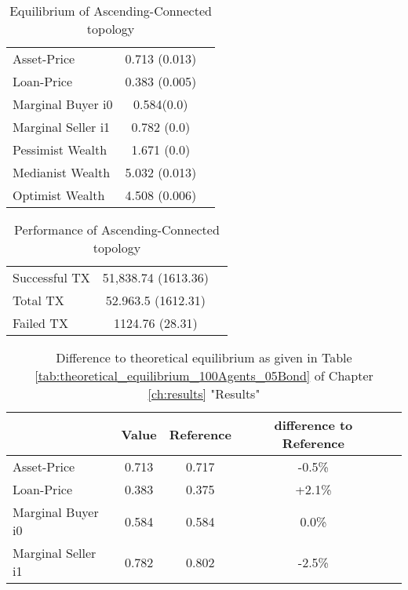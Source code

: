 \documentclass[Bachelorarbeit.tex]{subfiles}
\begin{document}
\begin{table}[h]
	\caption{Equilibrium of Ascending-Connected topology}
	\centering
	\begin{tabular} { l c r }
		\hline
		Asset-Price & 0.713 (0.013) \\
		Loan-Price & 0.383 (0.005) \\
		Marginal Buyer i0 & 0.584(0.0) \\
		Marginal Seller i1 & 0.782 (0.0) \\
		\hline
		Pessimist Wealth & 1.671 (0.0) \\
		Medianist Wealth & 5.032 (0.013) \\
		Optimist Wealth & 4.508 (0.006) \\
		\hline
	\end{tabular}
\end{table} 

\begin{table}[h]
	\caption{Performance of Ascending-Connected topology}
	\centering
	\begin{tabular} { l c r }
		\hline
		Successful TX & 51,838.74 (1613.36) \\
		Total TX & 52.963.5 (1612.31) \\
		Failed TX & 1124.76 (28.31) \\
		\hline
	\end{tabular}
\end{table}


\begin{table}[h]
	\caption{Difference to theoretical equilibrium as given in Table \ref{tab:theoretical_equilibrium_100Agents_05Bond} of Chapter \ref{ch:results} "Results"}
	\centering
	\begin{tabular} { l c c c r }
		& Value & Reference & difference to Reference \\
		\hline
		Asset-Price & 0.713 & 0.717 & -0.5\% \\
		Loan-Price & 0.383 & 0.375 & +2.1\% \\
		Marginal Buyer i0 & 0.584 & 0.584 & 0.0\% \\
		Marginal Seller i1 & 0.782 & 0.802 & -2.5\% \\
		\hline
	\end{tabular}
\end{table} 
\end{document}
